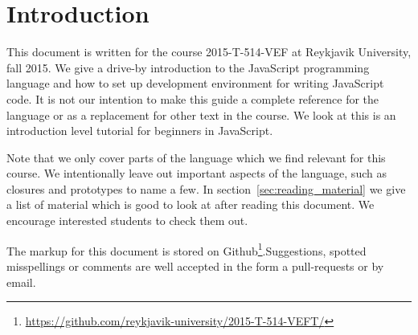 \section{Introduction}\label{sec:introduction}
This document is written for the course 2015-T-514-VEF at Reykjavik University, fall 2015. We give a drive-by introduction to the JavaScript programming language and how to set up development environment for writing JavaScript code. It is not our intention to make this guide a complete reference for the language or as a replacement for other text in the course. We look at this is an introduction level tutorial for beginners in JavaScript.

Note that we only cover parts of the language which we find relevant for this course. We intentionally leave out important aspects of the language, such as closures and prototypes to name a few. In section~\ref{sec:reading_material} we give a list of material which is good to look at after reading this document. We encourage interested students to check them out.

The markup for this document is stored on Github\footnote{\url{https://github.com/reykjavik-university/2015-T-514-VEFT/}}.Suggestions, spotted misspellings or comments are well accepted in the form a pull-requests or by email.
